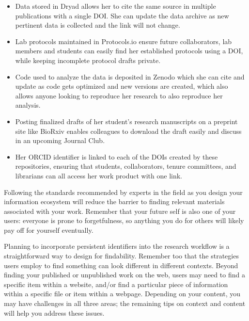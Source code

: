 \documentclass[10pt,letterpaper]{article}
\begin{document}
\begin{itemize}

\item
  Data stored in Dryad\cite{DRYAD2020} allows her to cite the same source in
  multiple publications with a single DOI. She can update the data archive as
  new pertinent data is collected and the link will not change.
 
\item
  Lab protocols maintained in Protocols.io\cite{Teytelman2016} ensure future
  collaborators, lab members and students can easily find her established
  protocols using a DOI, while keeping incomplete protocol drafts private.

\item
  Code used to analyze the data is deposited in Zenodo\cite{ZENODO2020} which
  she can cite and update as code gets optimized and new versions are created,
  which also allows anyone looking to reproduce her research to also reproduce
  her analysis.

\item
  Posting finalized drafts of her student's research manuscripts on a preprint
  site like BioRxiv\cite{bioRxiv2020} enables colleagues to download the draft
  easily and discuss in an upcoming Journal Club.
  
  \item
  Her ORCID identifier is linked to each of the DOIs created by these
  repositories, ensuring that students, collaborators, tenure committees, and
  librarians can all access her work product with one link.

\end{itemize}

\noindent
Following the standards recommended by experts\cite{Wilkinson2016} in the field
as you design your information ecosystem will reduce the barrier to finding
relevant materials associated with your work. Remember that your future self is
also one of your users: everyone is prone to forgetfulness, so anything you do
for others will likely pay off for yourself eventually\cite{Briney2015}.

Planning to incorporate persistent identifiers into the research workflow is a
straightforward way to design for findability. Remember too that the strategies
users employ to find something can look different in different contexts. Beyond
finding your published or unpublished work on the web, users may need to find a
specific item within a website, and/or find a particular piece of information
within a specific file or item within a webpage. Depending on your content, you
may have challenges in all three areas; the remaining tips on context and
content will help you address these issues.
\end{document}
